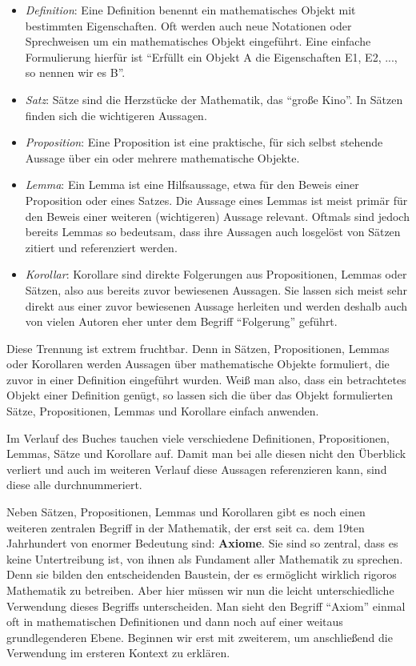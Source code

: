 \begin{itemize}
    \item \textit{Definition}: Eine Definition benennt ein mathematisches Objekt mit bestimmten Eigenschaften. Oft werden auch neue Notationen oder Sprechweisen um ein mathematisches Objekt eingeführt. Eine einfache Formulierung hierfür ist "`Erfüllt ein Objekt A die Eigenschaften E1, E2, ..., so nennen wir es B"'. 
    
    \item \textit{Satz}: Sätze sind die Herzstücke der Mathematik, das "`große Kino"'. In Sätzen finden sich die wichtigeren Aussagen.  
    
    \item \textit{Proposition}: Eine Proposition ist eine praktische, für sich selbst stehende Aussage über ein oder mehrere mathematische Objekte.  

    \item \textit{Lemma}: Ein Lemma ist eine Hilfsaussage, etwa für den Beweis einer Proposition oder eines Satzes. Die Aussage eines Lemmas ist meist primär für den Beweis einer weiteren (wichtigeren) Aussage relevant. Oftmals sind jedoch bereits Lemmas so bedeutsam, dass ihre Aussagen auch losgelöst von Sätzen zitiert und referenziert werden. 

    \item \textit{Korollar}: Korollare sind direkte Folgerungen aus Propositionen, Lemmas oder Sätzen, also aus bereits zuvor bewiesenen Aussagen. Sie lassen sich meist sehr direkt aus einer zuvor bewiesenen Aussage herleiten und werden deshalb auch von vielen Autoren eher unter dem Begriff "`Folgerung"' geführt. 
\end{itemize}
Diese Trennung ist extrem fruchtbar. Denn in Sätzen, Propositionen, Lemmas oder Korollaren werden Aussagen über mathematische Objekte formuliert, die zuvor in einer Definition eingeführt wurden. Weiß man also, dass ein betrachtetes Objekt einer Definition genügt, so lassen sich die über das Objekt formulierten Sätze, Propositionen, Lemmas und Korollare einfach anwenden. 

Im Verlauf des Buches tauchen viele verschiedene Definitionen, Propositionen, Lemmas, Sätze und Korollare auf. Damit man bei alle diesen nicht den Überblick verliert und auch im weiteren Verlauf diese Aussagen referenzieren kann, sind diese alle durchnummeriert. 

Neben Sätzen, Propositionen, Lemmas und Korollaren gibt es noch einen weiteren zentralen Begriff in der Mathematik, der erst seit ca. dem 19ten Jahrhundert von enormer Bedeutung sind: \textbf{Axiome}. Sie sind so zentral, dass es keine Untertreibung ist, von ihnen als Fundament aller Mathematik zu sprechen. Denn sie bilden den entscheidenden Baustein, der es ermöglicht wirklich rigoros Mathematik zu betreiben. Aber hier müssen wir nun die leicht unterschiedliche Verwendung dieses Begriffs unterscheiden. Man sieht den Begriff "`Axiom"' einmal oft in mathematischen Definitionen und dann noch auf einer weitaus grundlegenderen Ebene. Beginnen wir erst mit zweiterem, um anschließend die Verwendung im ersteren Kontext zu erklären. 

